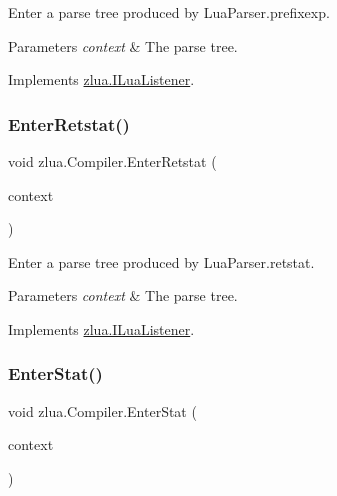 Enter a parse tree produced by Lua\+Parser.\+prefixexp. 


\begin{DoxyParams}{Parameters}
{\em context} & The parse tree.\\
\hline
\end{DoxyParams}


Implements \mbox{\hyperlink{interfacezlua_1_1_i_lua_listener_a77ffdad769c7c8266a678e93c529cdf6}{zlua.\+I\+Lua\+Listener}}.

\mbox{\label{classzlua_1_1_compiler_aee24dcb3e97d2fc95ec9c970867c8876}} 
\subsubsection{\texorpdfstring{Enter\+Retstat()}{EnterRetstat()}}
{\footnotesize\ttfamily void zlua.\+Compiler.\+Enter\+Retstat (\begin{DoxyParamCaption}\item[{\mbox{[}\+Not\+Null\mbox{]} \mbox{\hyperlink{classzlua_1_1_lua_parser_1_1_retstat_context}{Lua\+Parser.\+Retstat\+Context}}}]{context }\end{DoxyParamCaption})}



Enter a parse tree produced by Lua\+Parser.\+retstat. 


\begin{DoxyParams}{Parameters}
{\em context} & The parse tree.\\
\hline
\end{DoxyParams}


Implements \mbox{\hyperlink{interfacezlua_1_1_i_lua_listener_a0035b00baa60225e9b546903bf41835e}{zlua.\+I\+Lua\+Listener}}.

\mbox{\label{classzlua_1_1_compiler_a5edb39400f408df076c2ac83554f08eb}} 
\subsubsection{\texorpdfstring{Enter\+Stat()}{EnterStat()}}
{\footnotesize\ttfamily void zlua.\+Compiler.\+Enter\+Stat (\begin{DoxyParamCaption}\item[{\mbox{[}\+Not\+Null\mbox{]} \mbox{\hyperlink{classzlua_1_1_lua_parser_1_1_stat_context}{Lua\+Parser.\+Stat\+Context}}}]{context }\end{DoxyParamCaption})}




